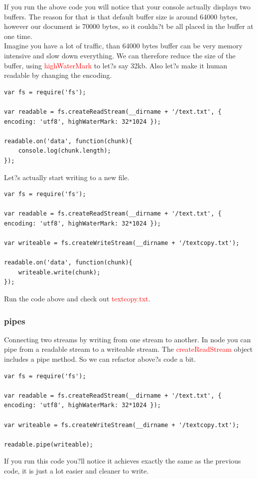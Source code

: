\documentclass[a4paper]{article}
\begin{document}
If you run the above code you will notice that your console actually displays two buffers. The reason for that is that default buffer size is around 64000 bytes, however our document is 70000 bytes, so it couldn?t be all placed in the buffer at one time.\\

Imagine you have a lot of traffic, than 64000 bytes buffer can be very memory intensive and slow down everything. We can therefore reduce the size of the buffer, using \textcolor{red}{highWaterMark} to let?s say 32kb. Also let?s make it human readable by changing the encoding.
\begin{lstlisting}
var fs = require('fs');

var readable = fs.createReadStream(__dirname + '/text.txt', { encoding: 'utf8', highWaterMark: 32*1024 });

readable.on('data', function(chunk){
    console.log(chunk.length);
});
\end{lstlisting}
Let?s actually start writing to a new file.
\begin{lstlisting}
var fs = require('fs');

var readable = fs.createReadStream(__dirname + '/text.txt', { encoding: 'utf8', highWaterMark: 32*1024 });

var writeable = fs.createWriteStream(__dirname + '/textcopy.txt');

readable.on('data', function(chunk){
    writeable.write(chunk);
});
\end{lstlisting}
Run the code above and check out \textcolor{red}{textcopy.txt}.
\subsubsection{pipes}
Connecting two streams by writing from one stream to another. In node you can pipe from a readable stream to a writeable stream. The \textcolor{red}{createReadStream} object includes a pipe method. So we can refactor above?s code a bit.
\begin{lstlisting}
var fs = require('fs');

var readable = fs.createReadStream(__dirname + '/text.txt', { encoding: 'utf8', highWaterMark: 32*1024 });

var writeable = fs.createWriteStream(__dirname + '/textcopy.txt');

readable.pipe(writeable);
\end{lstlisting}
If you run this code you?ll notice it achieves exactly the same as the previous code, it is just a lot easier and cleaner to write.\\
\end{document}
